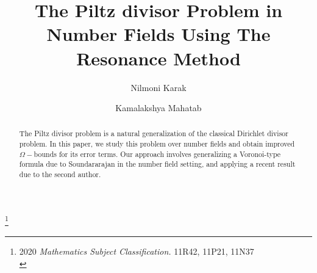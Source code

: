 \documentclass[reqno]{amsart}
\numberwithin{equation}{section}
\theoremstyle{plain}
\begin{document}
	\title[The Piltz divisor Problem in Number Field
	]{The Piltz divisor Problem in Number Fields Using The Resonance Method} 
	
	\author{Nilmoni Karak}
	\address{Nilmoni Karak\\ Department of Mathematics \\
		Indian Institute of Technology Kharagpur\\
		Kharagpur-721302,  India.}
	
	\author{Kamalakshya Mahatab}
	\address{Kamalaksya Mahatab\\ Department of Mathematics \\
		Indian Institute of Technology Kharagpur\\
		Kharagpur-721302,  India.}
	
	\thanks{2020 \textit{Mathematics Subject Classification.} 11R42, 11P21, 11N37\\}
	
	
	
	\begin{abstract}
The Piltz divisor problem is a natural generalization of the classical Dirichlet divisor problem. In this paper, we study this problem over number fields and obtain improved 
$\Omega-$bounds for its error terms. Our approach involves generalizing a Voronoi-type formula due to Soundararajan in the number field setting, and applying a recent result due to the second author. 
	\end{abstract}
	\maketitle
	
\end{document}
